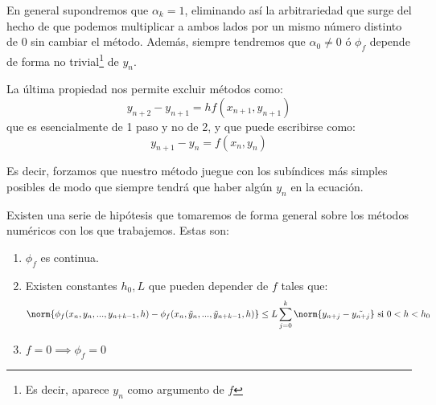 \documentclass{apuntes}
\begin{document}
En general supondremos que $α_k=1$, eliminando así la arbitrariedad que surge del hecho de que podemos multiplicar a ambos lados por un mismo número distinto de 0 sin cambiar el método. Además, siempre tendremos que $α_0 \neq 0$ ó $\phi_f$ depende de forma no trivial\footnote{Es decir, aparece $y_n$ como argumento de $f$} de $y_n$.

La última propiedad nos permite excluir métodos como:
\[y_{n+2}-y_{n+1}=hf(x_{n+1},y_{n+1})\]
que es esencialmente de 1 paso y no de 2, y que puede escribirse como:
\[y_{n+1}-y_n = f(x_n,y_n)\]

Es decir, forzamos que nuestro método juegue con los subíndices más simples posibles de modo que siempre tendrá que haber algún $y_n$ en la ecuación.

\begin{prop}
Existen una serie de hipótesis que tomaremos de forma general sobre los métodos numéricos con los que trabajemos. Estas son:

\begin{enumerate}
\item $\phi_f$ es continua.

\item Existen constantes $h_0,L$ que pueden depender de $f$ tales que:
\[\norm{\phi_f(x_n,y_n,...,y_{n+k-1},h) - \phi_f(x_n,\tilde{y}_n,...,\tilde{y}_{n+k-1},h)}\leq L \sum_{j=0}^k \norm{y_{n+j}-\tilde{y_{n+j}}} \text{ si } 0 < h < h_0\]

\item $f= 0 \implies \phi_f=0$


\end{enumerate}
\end{prop}
\end{document}
